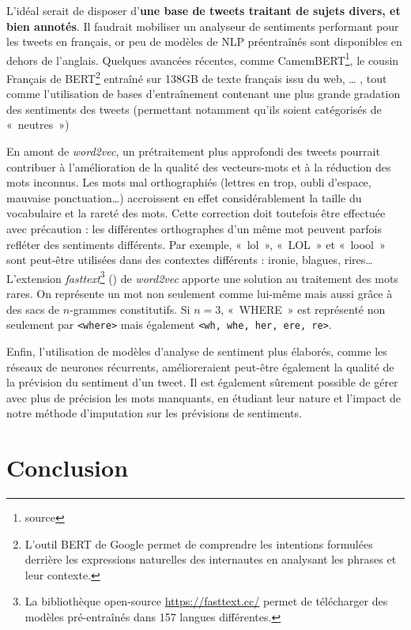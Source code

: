 \documentclass[11pt,french,french]{article}
\let\rmarkdownfootnote\footnote%
\def\footnote{\protect\rmarkdownfootnote}
\begin{document}
L'idéal serait de disposer d'\textbf{une base de tweets traitant de sujets divers, et bien annotés}. Il faudrait mobiliser un analyseur de sentiments performant pour les tweets en français, or peu de modèles de NLP préentraînés sont disponibles en dehors de l'anglais. Quelques avancées récentes, comme CamemBERT\footnote{source}, le cousin Français de BERT\footnote{L'outil BERT de Google permet de comprendre les intentions formulées derrière les expressions naturelles des internautes en analysant les phrases et leur contexte.} entraîné sur 138GB de texte français issu du web, \ldots{}
, tout comme l'utilisation de bases d'entraînement contenant une plus grande gradation des sentiments des tweets (permettant notamment qu'ils soient catégorisés de «~neutres~»)

En amont de \emph{word2vec}, un prétraitement plus approfondi des tweets pourrait contribuer à l'amélioration de la qualité des vecteurs-mots et à la réduction des mots inconnus. Les mots mal orthographiés (lettres en trop, oubli d'espace, mauvaise ponctuation\dots) accroissent en effet considérablement la taille du vocabulaire et la rareté des mots. Cette correction doit toutefois être effectuée avec précaution : les différentes orthographes d'un même mot peuvent parfois refléter des sentiments différents.
Par exemple, «~lol~», «~LOL~» et «~loool~» sont peut-être utilisées dans des contextes différents : ironie, blagues, rires\dots L'extension \emph{fasttext}\footnote{La bibliothèque open-source \url{https://fasttext.cc/} permet de télécharger des modèles pré-entraînés dans 157 langues différentes.} (\cite{Bojanowski}) de \emph{word2vec} apporte une solution au traitement des mots rares. On représente un mot non seulement comme lui-même mais aussi grâce à des sacs de \(n\)-grammes constitutifs.
Si \(n = 3\), «~WHERE~» est représenté non seulement par \texttt{\textless{}where\textgreater{}} mais également \texttt{\textless{}wh,\ whe,\ her,\ ere,\ re\textgreater{}}.

Enfin, l'utilisation de modèles d'analyse de sentiment plus élaborés, comme les réseaux de neurones récurrents, amélioreraient peut-être également la qualité de la prévision du sentiment d'un tweet. Il est également sûrement possible de gérer avec plus de précision les mots manquants, en étudiant leur nature et l'impact de notre méthode d'imputation sur les prévisions de sentiments.

\newpage

\hypertarget{conclusion}{%
\section*{Conclusion}\label{conclusion}}
\end{document}
